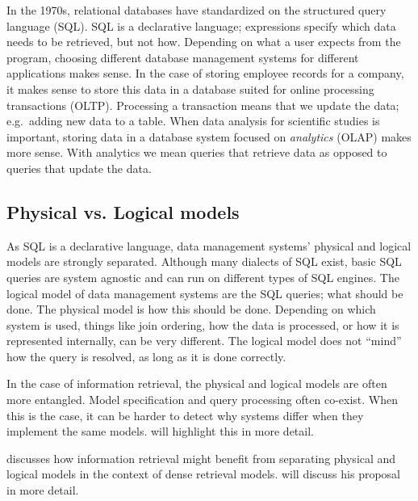 In the 1970s, relational databases have standardized on the structured query language (SQL).  
SQL is a declarative language; expressions specify which data needs to be retrieved, but not how. Depending on what a user expects from the program, choosing different database management systems for different applications makes sense. In the case of storing employee records for a company, it makes sense to store this data in a database suited for online processing transactions (OLTP). Processing a transaction means that we update the data; e.g.\ adding new data to a table. When data analysis for scientific studies is important, storing data in a database system focused on \emph{analytics} (OLAP) makes more sense. With analytics we mean queries that retrieve data as opposed to queries that update the data.  

\subsection{Physical vs. Logical models}
As SQL is a declarative language, data management systems' physical and logical models are strongly separated. Although many dialects of SQL exist, basic SQL queries are system agnostic and can run on different types of SQL engines. The logical model of data management systems are the SQL queries; what should be done. The physical model is how this should be done. Depending on which system is used, things like join ordering, how the data is processed, or how it is represented internally, can be very different. The logical model does not ``mind'' how the query is resolved, as long as it is done correctly. 

In the case of information retrieval, the physical and logical models are often more entangled. Model specification and query processing often co-exist. When this is the case, it can be harder to detect why systems differ when they implement the same models.  will highlight this in more detail. 

\citet{seperation-logical-physical} discusses how information retrieval might benefit from separating physical and logical models in the context of dense retrieval models.  will discuss his proposal in more detail.

